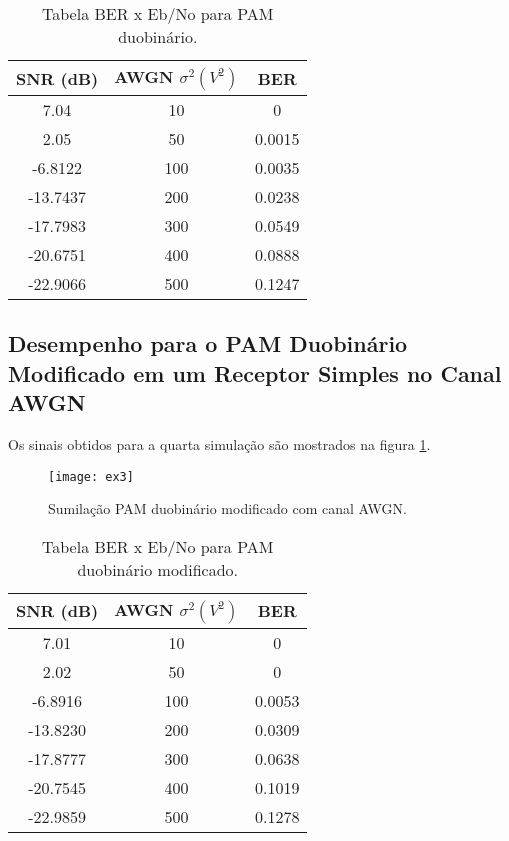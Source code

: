 \begin{table}[H]
  \begin{center}
    \caption{Tabela BER x Eb/No para PAM duobinário.}
    \begin{tabular}{|c|c|c|}
      \hline
      SNR (dB) & AWGN $\sigma^2 (V^2)$ & BER \\
      \hline
      7.04 & 10 & 0 \\
      \hline
      2.05 & 50 &  0.0015\\
      \hline
      -6.8122 & 100 & 0.0035\\
      \hline
      -13.7437 & 200 & 0.0238 \\
      \hline
      -17.7983 & 300 & 0.0549  \\
      \hline
      -20.6751 & 400 & 0.0888 \\
      \hline 
      -22.9066 & 500 & 0.1247\\
      \hline
    \end{tabular}
    \label{tab:ex3}
  \end{center}
\end{table}

\subsection{Desempenho para o PAM Duobinário Modificado em um Receptor 
Simples no Canal AWGN}

Os sinais obtidos para a quarta simulação são mostrados na figura  
\ref{fig:ex4}.
\begin{figure}[H]
  \centering
  \caption{Sumilação PAM duobinário modificado com canal AWGN.}
  \texttt{[image: ex3]}
  \label{fig:ex4}
\end{figure}

              
 
\begin{table}[H]
  \begin{center}
    \caption{Tabela BER x Eb/No para PAM duobinário modificado.}
    \begin{tabular}{|c|c|c|}
      \hline
      SNR (dB) & AWGN $\sigma^2 (V^2)$ & BER \\
      \hline
      7.01 & 10 & 0 \\
      \hline
      2.02& 50 & 0 \\
      \hline
      -6.8916 & 100 & 0.0053\\
      \hline
     -13.8230& 200 & 0.0309\\
      \hline
      -17.8777& 300 & 0.0638\\
      \hline
      -20.7545& 400 & 0.1019\\
      \hline 
      -22.9859& 500 & 0.1278\\
      \hline
    \end{tabular}
    \label{tab:simmdb}
  \end{center}
\end{table}

